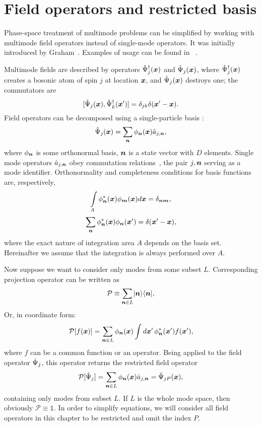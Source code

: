 \section{Field operators and restricted basis}

Phase-space treatment of multimode problems can be simplified by working with multimode field operators instead of single-mode operators.
It was initially introduced by Graham~\cite{Graham1970,Graham1970a}.
Examples of usage can be found in ~\cite{Steel1998,Norrie2006a}.

Multimode fields are described by operators $\hat{\Psi}_j^{\dagger}(\boldsymbol{x})$ and $\hat{\Psi}_j(\boldsymbol{x})$,
where $\hat{\Psi}_j^{\dagger}(\boldsymbol{x})$ creates a bosonic atom of spin $j$ at location $\boldsymbol{x}$,
and $\hat{\Psi}_j(\boldsymbol{x})$ destroys one;
the commutators are
\begin{equation}
\label{eqn:formalism:func-aux:commutators}
	[ \hat{\Psi}_j(\boldsymbol{x}), \hat{\Psi}_k^{\dagger}(\boldsymbol{x}^\prime) ]
	= \delta_{jk} \delta(\boldsymbol{x}^\prime-\boldsymbol{x}).
\end{equation}
Field operators can be decomposed using a single-particle basis :
\[
	\hat{\Psi}_j(\boldsymbol{x}) = \sum\limits_{\boldsymbol{n}} \phi_{\boldsymbol{n}}(\boldsymbol{x}) \hat{a}_{j,\boldsymbol{n}},
\]
where $\phi_{\boldsymbol{n}}$ is some orthonormal basis,
$\boldsymbol{n}$ is a state vector with $D$ elements.
Single mode operators $\hat{a}_{j,\boldsymbol{n}}$ obey commutation relations~,
the pair $j,\boldsymbol{n}$ serving as a mode identifier.
Orthonormality and completeness conditions for basis functions are, respectively,
\[
	\int\limits_A \phi_{\boldsymbol{n}}^*(\boldsymbol{x}) \phi_{\boldsymbol{m}}(\boldsymbol{x}) d\boldsymbol{x} = \delta_{\boldsymbol{n}\boldsymbol{m}},
\]
\[
	\sum\limits_{\boldsymbol{n}} \phi_{\boldsymbol{n}}^*(\boldsymbol{x}) \phi_{\boldsymbol{n}}(\boldsymbol{x}^\prime) = \delta(\boldsymbol{x}^\prime - \boldsymbol{x}),
\]
where the exact nature of integration area $A$ depends on the basis set.
Hereinafter we assume that the integration is always performed over $A$.

Now suppose we want to consider only modes from some subset $L$.
Corresponding projection operator can be written as
\[
	\mathcal{P} \equiv \sum\limits_{\boldsymbol{n} \in L} \lvert \boldsymbol{n} \rangle \langle \boldsymbol{n} \rvert,
\]
Or, in coordinate form:
\[
	\mathcal{P} [f(\boldsymbol{x})]
	= \sum\limits_{\boldsymbol{n} \in L} \phi_{\boldsymbol{n}} (\boldsymbol{x}) \int
		d\boldsymbol{x}^\prime\, \phi_{\boldsymbol{n}}^*(\boldsymbol{x}^\prime) f(\boldsymbol{x}^\prime),
\]
where $f$ can be a common function or an operator.
Being applied to the field operator $\hat{\Psi}_j$, this operator returns the restricted field operator
\[
	\mathcal{P} [\hat{\Psi}_j]
	= \sum\limits_{\boldsymbol{n} \in L} \phi_{\boldsymbol{n}} (\boldsymbol{x}) \hat{a}_{j,\boldsymbol{n}}
	= \hat{\Psi}_{jP} (\boldsymbol{x}),
\]
containing only modes from subset $L$.
If $L$ is the whole mode space, then obviously $\mathcal{P} \equiv \mathds{1}$.
In order to simplify equations, we will consider all field operators in this chapter to be restricted and omit the index $P$.

